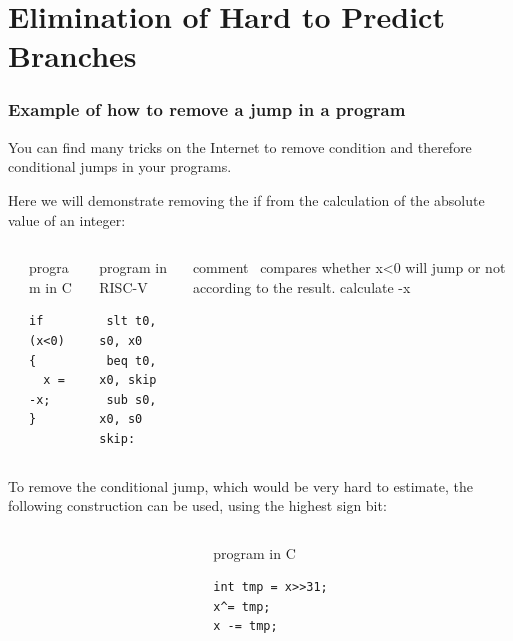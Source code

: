 \documentclass{beamer}
\begin{document}
\section{Elimination of Hard to Predict Branches}

\begin{frame}[fragile]
\frametitle{Example of how to remove a jump in a program}

You can find many tricks on the Internet to remove condition and therefore conditional jumps in your programs.

Here we will demonstrate removing the if from the calculation of the absolute value of an integer:

\begin{columns}[T]
\begin{column}{0.01\textwidth}
\phantom{x}
\end{column}
\begin{column}{0.25\textwidth}
program in C
\begin{verbatim}
if (x<0) {
  x = -x;
}
\end{verbatim}
\end{column}

\begin{column}{0.28\textwidth}
program in RISC-V
\begin{verbatim}
 slt t0, s0, x0
 beq t0, x0, skip
 sub s0, x0, s0
skip:
\end{verbatim}
\end{column}
\begin{column}{0.45\textwidth}
\phantom{x}comment\
\small
compares whether x<0
will jump or not according to the result.
calculate -x
\end{column}
\end{columns}
\bigskip

To remove the conditional jump, which would be very hard to estimate, the following construction can be used, using the highest sign bit:
\begin{columns}[T]
\begin{column}{0.01\textwidth}
\phantom{x}
\end{column}
\begin{column}{0.25\textwidth}
program in C
\begin{verbatim}
int tmp = x>>31;
x^= tmp;
x -= tmp;
\end{verbatim}
\end{column}


\end{columns}
\end{frame}
\end{document}
